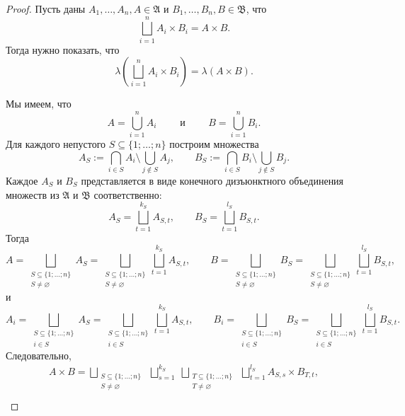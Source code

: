 \documentclass[12pt,a4paper]{article}
\begin{document}
    \begin{proof}
        Пусть даны $A_1, \dots, A_n, A \in \mathfrak{A}$ и $B_1, \dots, B_n, B \in \mathfrak{B}$, что
        \[\bigsqcup_{i=1}^n A_i \times B_i = A \times B.\]
        Тогда нужно показать, что
        \[\lambda\left(\bigsqcup_{i=1}^n A_i \times B_i\right) = \lambda(A \times B).\]

        Мы имеем, что
        \[
            A = \bigcup_{i=1}^n A_i
            \qquad \text{ и } \qquad
            B = \bigcup_{i=1}^n B_i.
        \]
        Для каждого непустого $S \subseteq \{1; \dots; n\}$ построим множества
        \[
            A_S := \bigcap_{i \in S} A_i \setminus \bigcup_{j \notin S} A_j,
            \qquad
            B_S := \bigcap_{i \in S} B_i \setminus \bigcup_{j \notin S} B_j.
        \]
        Каждое $A_S$ и $B_S$ представляется в виде конечного дизъюнктного объединения множеств из $\mathfrak{A}$ и $\mathfrak{B}$ соответственно:
        \[
            A_S = \bigsqcup_{t=1}^{k_S} A_{S, t},
            \qquad
            B_S = \bigsqcup_{t=1}^{l_S} B_{S, t}.
        \]
        Тогда
        \[
            A = \bigsqcup_{\substack{S \subseteq \{1; \dots; n\}\\ S \neq \varnothing}} A_S = \bigsqcup_{\substack{S \subseteq \{1; \dots; n\}\\ S \neq \varnothing}} \bigsqcup_{t=1}^{k_S} A_{S, t},
            \qquad
            B = \bigsqcup_{\substack{S \subseteq \{1; \dots; n\}\\ S \neq \varnothing}} B_S = \bigsqcup_{\substack{S \subseteq \{1; \dots; n\}\\ S \neq \varnothing}} \bigsqcup_{t=1}^{l_S} B_{S, t},
        \]
        и
        \[
            A_i = \bigsqcup_{\substack{S \subseteq \{1; \dots; n\}\\ i \in S}} A_S = \bigsqcup_{\substack{S \subseteq \{1; \dots; n\}\\ i \in S}} \bigsqcup_{t=1}^{k_S} A_{S, t},
            \qquad
            B_i = \bigsqcup_{\substack{S \subseteq \{1; \dots; n\}\\ i \in S}} B_S = \bigsqcup_{\substack{S \subseteq \{1; \dots; n\}\\ i \in S}} \bigsqcup_{t=1}^{l_S} B_{S, t}.
        \]
        Следовательно,
        \begin{gather*}
            A \times B = \bigsqcup_{\substack{S \subseteq \{1; \dots; n\}\\ S \neq \varnothing}} \; \bigsqcup_{s=1}^{k_S} \; \bigsqcup_{\substack{T \subseteq \{1; \dots; n\}\\ T \neq \varnothing}} \; \bigsqcup_{t=1}^{l_S} A_{S, s} \times B_{T, t},\\

\end{gather*}
\end{proof}
\end{document}
